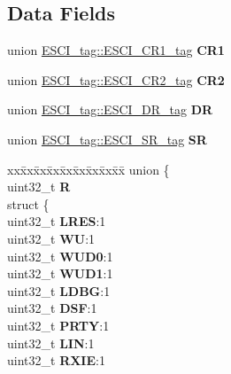 \subsection*{Data Fields}
\begin{DoxyCompactItemize}
\item 
\mbox{\label{structESCI__tag_ade70add3969cd54969405a900d3fa7f9}} 
union \mbox{\hyperlink{unionESCI__tag_1_1ESCI__CR1__tag}{E\+S\+C\+I\+\_\+tag\+::\+E\+S\+C\+I\+\_\+\+C\+R1\+\_\+tag}} {\bfseries C\+R1}
\item 
\mbox{\label{structESCI__tag_a08bb3b74129ea3516e48420a3624626d}} 
union \mbox{\hyperlink{unionESCI__tag_1_1ESCI__CR2__tag}{E\+S\+C\+I\+\_\+tag\+::\+E\+S\+C\+I\+\_\+\+C\+R2\+\_\+tag}} {\bfseries C\+R2}
\item 
\mbox{\label{structESCI__tag_a7136b0c040d3be83d53e3d067e1b3238}} 
union \mbox{\hyperlink{unionESCI__tag_1_1ESCI__DR__tag}{E\+S\+C\+I\+\_\+tag\+::\+E\+S\+C\+I\+\_\+\+D\+R\+\_\+tag}} {\bfseries DR}
\item 
\mbox{\label{structESCI__tag_aa3aa0384fedc147aeace211daeb65e9a}} 
union \mbox{\hyperlink{unionESCI__tag_1_1ESCI__SR__tag}{E\+S\+C\+I\+\_\+tag\+::\+E\+S\+C\+I\+\_\+\+S\+R\+\_\+tag}} {\bfseries SR}
\item 
\mbox{\label{structESCI__tag_a685850a4d1d0065d2c89daa9694d89d2}} 
\begin{tabbing}
xx\=xx\=xx\=xx\=xx\=xx\=xx\=xx\=xx\=\kill
union \{\\
\>uint32\_t {\bfseries R}\\
\>struct \{\\
\>\>uint32\_t {\bfseries LRES}:1\\
\>\>uint32\_t {\bfseries WU}:1\\
\>\>uint32\_t {\bfseries WUD0}:1\\
\>\>uint32\_t {\bfseries WUD1}:1\\
\>\>uint32\_t {\bfseries LDBG}:1\\
\>\>uint32\_t {\bfseries DSF}:1\\
\>\>uint32\_t {\bfseries PRTY}:1\\
\>\>uint32\_t {\bfseries LIN}:1\\
\>\>uint32\_t {\bfseries RXIE}:1\\

\end{tabbing}
\end{DoxyCompactItemize}
